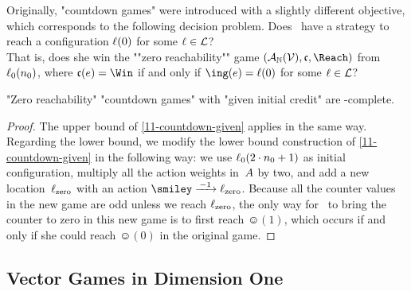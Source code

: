 \medskip
Originally, "countdown games" were introduced with a slightly
different objective, which corresponds to the following decision
problem.
\AP{}
  {Does \Eve\ have a strategy to reach a configuration $\ell(0)$ for
  some $\ell\in\mathcal L$?\\That is, does she win the ""zero
  reachability""
  game $(\?A_\+N(\?V),\col,\Reach)$ from $\ell_0(n_0)$, where
  $\col(e)=\Win$ if and only if $\ing(e)=\loc(0)$ for some $\ell\in\mathcal L$?}
\begin{theorem}\label{11-countdown-zero}
  "Zero reachability" "countdown games" with "given initial credit"
  are \EXP-complete.
\end{theorem}
\begin{proof}
  The upper bound of \cref{11-countdown-given} applies in the same
  way.  Regarding the lower bound, we modify the lower bound
  construction of \cref{11-countdown-given} in the following way: we
  use $\ell_0(2\cdot n_0+1)$ as initial configuration, multiply all
  the action weights in~$A$ by two, and add a new
  location~$\ell_\mathrm{zero}$ with an action
  $\smiley\step{-1}\loc_\mathrm{zero}$.  Because all the counter
  values in the new game are odd unless we reach $\ell_\mathrm{zero}$,
  the only way for \Eve\ to bring the counter to zero in this new game
  is to first reach $\smiley(1)$, which occurs if and only if she
  could reach $\smiley(0)$ in the original game.
\end{proof}

\subsection{Vector Games in Dimension One}
\label{11-one-counter}

